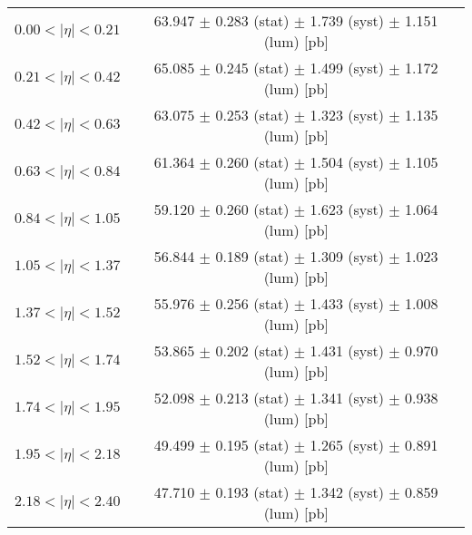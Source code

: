 \begin{tabular}{lc}
\hline
$0.00 < |\eta| <0.21$          & 63.947 $\pm$ 0.283 (stat) $\pm$ 1.739 (syst) $\pm$ 1.151 (lum) [pb]  \\
$0.21 < |\eta| <0.42$          & 65.085 $\pm$ 0.245 (stat) $\pm$ 1.499 (syst) $\pm$ 1.172 (lum) [pb]  \\
$0.42 < |\eta| <0.63$          & 63.075 $\pm$ 0.253 (stat) $\pm$ 1.323 (syst) $\pm$ 1.135 (lum) [pb]  \\
$0.63 < |\eta| <0.84$          & 61.364 $\pm$ 0.260 (stat) $\pm$ 1.504 (syst) $\pm$ 1.105 (lum) [pb]  \\
$0.84 < |\eta| <1.05$          & 59.120 $\pm$ 0.260 (stat) $\pm$ 1.623 (syst) $\pm$ 1.064 (lum) [pb]  \\
$1.05 < |\eta| <1.37$          & 56.844 $\pm$ 0.189 (stat) $\pm$ 1.309 (syst) $\pm$ 1.023 (lum) [pb]  \\
$1.37 < |\eta| <1.52$          & 55.976 $\pm$ 0.256 (stat) $\pm$ 1.433 (syst) $\pm$ 1.008 (lum) [pb]  \\
$1.52 < |\eta| <1.74$          & 53.865 $\pm$ 0.202 (stat) $\pm$ 1.431 (syst) $\pm$ 0.970 (lum) [pb]  \\
$1.74 < |\eta| <1.95$          & 52.098 $\pm$ 0.213 (stat) $\pm$ 1.341 (syst) $\pm$ 0.938 (lum) [pb]  \\
$1.95 < |\eta| <2.18$          & 49.499 $\pm$ 0.195 (stat) $\pm$ 1.265 (syst) $\pm$ 0.891 (lum) [pb]  \\
$2.18 < |\eta| <2.40$          & 47.710 $\pm$ 0.193 (stat) $\pm$ 1.342 (syst) $\pm$ 0.859 (lum) [pb]  \\
\hline
\end{tabular}

